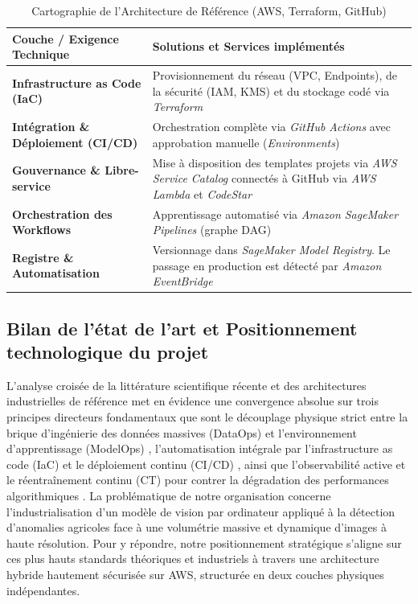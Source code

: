 \begin{table}[H]
\centering
\caption{Cartographie de l'Architecture de Référence (AWS, Terraform, GitHub)}
\label{tab:terraform_mapping}
\renewcommand{\arraystretch}{1.3}
\begin{tabular}{|p{5.5cm}|p{8.5cm}|}
\hline
\rowcolor{darkgreen!20} \textbf{Couche / Exigence Technique} & \textbf{Solutions et Services implémentés} \\ \hline
\textbf{Infrastructure as Code (IaC)} & Provisionnement du réseau (VPC, Endpoints), de la sécurité (IAM, KMS) et du stockage codé via \textit{Terraform} \cite{83} \\ \hline
\textbf{Intégration \& Déploiement (CI/CD)} & Orchestration complète via \textit{GitHub Actions} avec approbation manuelle (\textit{Environments}) \cite{79, 83} \\ \hline
\textbf{Gouvernance \& Libre-service} & Mise à disposition des templates projets via \textit{AWS Service Catalog} connectés à GitHub via \textit{AWS Lambda} et \textit{CodeStar} \cite{79, 83} \\ \hline
\textbf{Orchestration des Workflows} & Apprentissage automatisé via \textit{Amazon SageMaker Pipelines} (graphe DAG) \cite{79, 83} \\ \hline
\textbf{Registre \& Automatisation} & Versionnage dans \textit{SageMaker Model Registry}. Le passage en production est détecté par \textit{Amazon EventBridge} \cite{79} \\ \hline
\end{tabular}
\end{table}



\subsection{Bilan de l'état de l'art et Positionnement technologique du projet}
\label{subsec:bilan_positionnement}

L'analyse croisée de la littérature scientifique récente \cite{88, 89, 90, 91, 92, 93, 94, 95} et des architectures industrielles de référence met en évidence une convergence absolue sur trois principes directeurs fondamentaux que sont le découplage physique strict entre la brique d'ingénierie des données massives (DataOps) et l'environnement d'apprentissage (ModelOps) \cite{89, 94}, l'automatisation intégrale par l'infrastructure as code (IaC) et le déploiement continu (CI/CD) \cite{92, 93}, ainsi que l'observabilité active et le réentraînement continu (CT) pour contrer la dégradation des performances algorithmiques \cite{91, 95}. La problématique de notre organisation concerne l'industrialisation d'un modèle de vision par ordinateur appliqué à la détection d'anomalies agricoles face à une volumétrie massive et dynamique d'images à haute résolution. Pour y répondre, notre positionnement stratégique s'aligne sur ces plus hauts standards théoriques et industriels à travers une architecture hybride hautement sécurisée sur AWS, structurée en deux couches physiques indépendantes.

